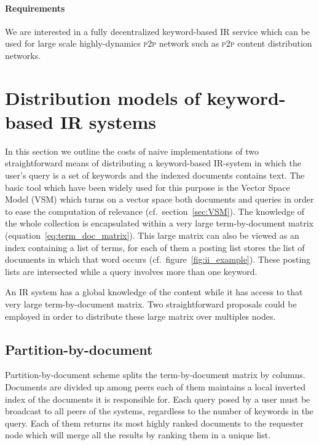 \paragraph{Requirements} We are interested in a fully decentralized keyword-based IR service which can be used for large scale highly-dynamics \textsc{p2p} network such as \textsc{p2p} content distribution networks.

\section[Distribution models]{\label{sec:distr_models}Distribution models of keyword-based IR systems}
In this section we outline the costs of naive implementations of two straightforward means of distributing a keyword-based IR-system in which the user's query is a set of keywords and the indexed documents contains text. The basic tool which have been widely used for this purpose is the Vector Space Model (VSM) which turns on a vector space both documents and queries in order to ease the computation of relevance (cf.\ section~\ref{sec:VSM}). The knowledge of the whole collection is encapsulated within a very large term-by-document matrix (equation~\ref{eq:term_doc_matrix}). This large matrix can also be viewed as an index containing a list of terms, for each of them a posting list stores the list of documents in which that word occurs (cf.\ figure~\ref{fig:ii_example}). These posting lists are intersected while a query involves more than one keyword.

An IR system has a global knowledge of the content while it has access to that very large term-by-document matrix. Two straightforward proposals could be employed in order to distribute these large matrix over multiples nodes.

\subsection{Partition-by-document} Partition-by-document scheme splits the term-by-document matrix by columns. Documents are divided up among peers each of them maintains a local inverted index of the documents it is responsible for. Each query posed by a user must be broadcast to all peers of the systems, regardless to the number of keywords in the query. Each of them returns its most highly ranked documents to the requester node which will merge all the results by ranking them in a unique list.

